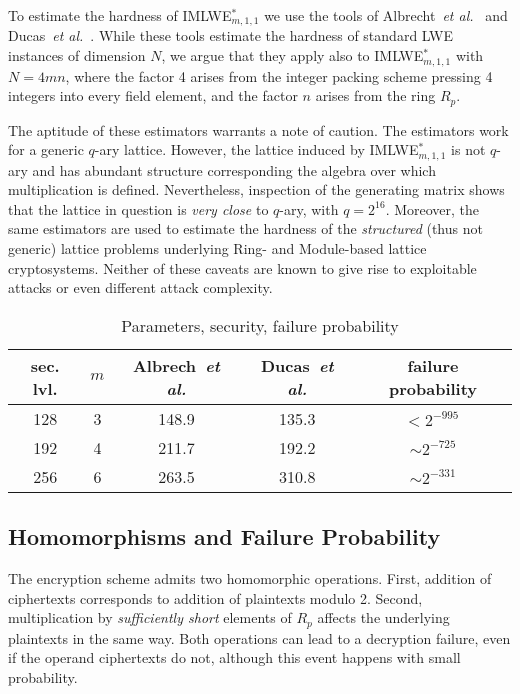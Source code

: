To estimate the hardness of IMLWE$^*_{m, 1, 1}$ we use the tools of Albrecht~\emph{et al.}~\cite{albrecht-estimator} and Ducas~\emph{et al.}~\cite{ducas-estimator}. While these tools estimate the hardness of standard LWE instances of dimension $N$, we argue that they apply also to IMLWE$^*_{m,1,1}$ with $N = 4 m n$, where the factor 4 arises from the integer packing scheme pressing 4 integers into every field element, and the factor $n$ arises from the ring $R_p$.

The aptitude of these estimators warrants a note of caution. The estimators work for a generic $q$-ary lattice. However, the lattice induced by IMLWE$^*_{m,1,1}$ is not $q$-ary and has abundant structure corresponding the algebra over which multiplication is defined. Nevertheless, inspection of the generating matrix shows that the lattice in question is \emph{very close} to $q$-ary, with $q = 2^{16}$. Moreover, the same estimators are used to estimate the hardness of the \emph{structured} (thus not generic) lattice problems underlying Ring- and Module-based lattice cryptosystems. Neither of these caveats are known to give rise to exploitable attacks or even different attack complexity.

\begin{table}
\centering
\caption{Parameters, security, failure probability}
\label{table:parameters}
\begin{tabular}{c||c|c|c|c}
sec. lvl. & $m$ & Albrech~\emph{et al.} & Ducas~\emph{et al.} & failure probability \\ \hline
128 & 3 & 148.9 & 135.3 & $< 2^{-995\phantom{\vert}}$ \\
192 & 4 & 211.7 & 192.2 & $\sim 2^{-725}$ \\
256 & 6 & 263.5 & 310.8 & $\sim 2^{-331}$
\end{tabular}
\end{table}

\subsection{Homomorphisms and Failure Probability}

The encryption scheme admits two homomorphic operations. First, addition of ciphertexts corresponds to addition of plaintexts modulo 2. Second, multiplication by \emph{sufficiently short} elements of $R_p$ affects the underlying plaintexts in the same way. Both operations can lead to a decryption failure, even if the operand ciphertexts do not, although this event happens with small probability.

